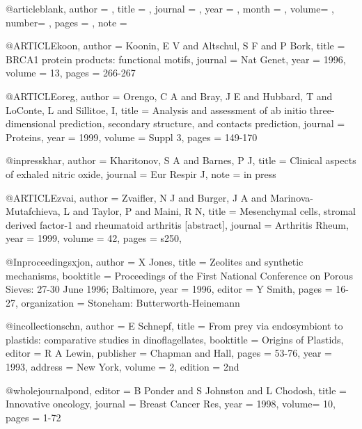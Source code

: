 % 


@article{blank,
	author  = {}, 
	title   = {},
	journal = {}, 
	year  = {},
	  month = {}, 
	  volume= {}, 
	  number= {}, 
	  pages = {},
	  note  = {} 
}	

@ARTICLE{koon,
	author  = {Koonin, E V and Altschul, S F and P Bork}, 
	title   = {BRCA1 protein products: functional motifs}, 
	journal = {Nat Genet}, 
	year    = {1996},
	volume  = {13}, 
	pages   = {266-267}
}	

@ARTICLE{oreg,
	author  = {Orengo, C A and Bray, J E and Hubbard, 
		   T and LoConte, L and Sillitoe, I}, 
	title   = {Analysis and assessment of ab initio 
		   three-dimensional prediction, secondary 
		   structure, and contacts prediction},
	journal = {Proteins}, 
	year    = {1999},
	volume  = {Suppl 3}, 
	pages   = {149-170}
}	

@inpress{khar,
	author  = {Kharitonov, S A and Barnes, P J}, 
	title   = {Clinical aspects of exhaled nitric oxide},
	journal = {Eur Respir J}, 
	note    = {in press} 
}	

%
%
@ARTICLE{zvai,
	author  = {Zvaifler, N J and Burger, J A and Marinova-Mutafchieva, 
		   L and Taylor, P and Maini, R N},
	title   = {Mesenchymal cells, stromal derived factor-1 and 
		   rheumatoid arthritis [abstract]},
	journal = {Arthritis Rheum}, 
	year    = {1999},
	volume  = {42}, 
	pages   = {s250},
}	


%
%
@Inproceedings{xjon,
	author    = {X Jones}, 
	title     = {Zeolites and synthetic mechanisms},
	booktitle = {Proceedings of the First National Conference on 
		     Porous Sieves: 27-30 June 1996; Baltimore},
	year      = {1996},
	  editor  = {Y Smith}, 
	  pages   = {16-27},
	  organization  = {Stoneham: Butterworth-Heinemann}
}	

%
@incollection{schn,
	author    = {E Schnepf}, 
	title     = {From prey via endosymbiont to plastids: 
		     comparative studies in dinoflagellates},
	booktitle = {Origins of Plastids}, 
	editor    = {R A Lewin}, 
	publisher = {Chapman and Hall},
	pages     = {53-76}, 
	year      = {1993},
	  address = {New York}, 
	  volume  = {2}, 
	  edition = {2nd} 
}	

%
@wholejournal{pond,
	editor  = {B Ponder and S Johnston and L Chodosh}, 
	title   = {Innovative oncology},
	journal = {Breast Cancer Res}, 
	year  = {1998},
	  volume= {10}, 
	  pages = {1-72}
}	


